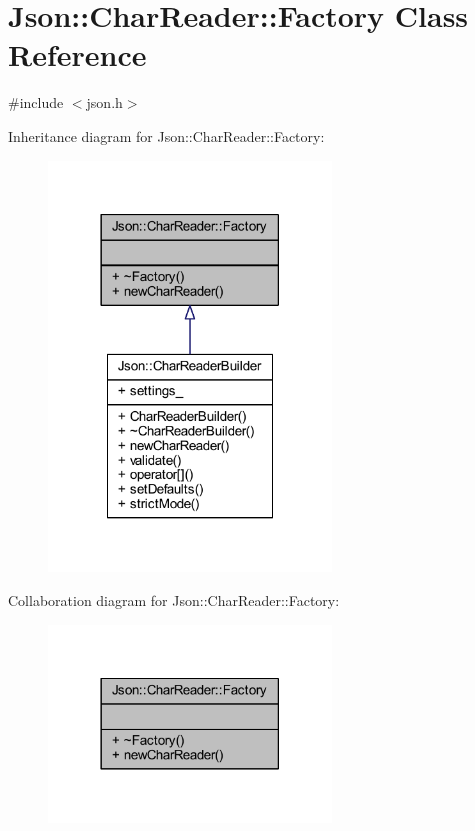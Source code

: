\hypertarget{class_json_1_1_char_reader_1_1_factory}{}\section{Json\+:\+:Char\+Reader\+:\+:Factory Class Reference}
\label{class_json_1_1_char_reader_1_1_factory}


{\ttfamily \#include $<$json.\+h$>$}



Inheritance diagram for Json\+:\+:Char\+Reader\+:\+:Factory\+:\nopagebreak
\begin{figure}[H]
\begin{center}
\leavevmode
\includegraphics[width=213pt]{class_json_1_1_char_reader_1_1_factory__inherit__graph}
\end{center}
\end{figure}


Collaboration diagram for Json\+:\+:Char\+Reader\+:\+:Factory\+:\nopagebreak
\begin{figure}[H]
\begin{center}
\leavevmode
\includegraphics[width=213pt]{class_json_1_1_char_reader_1_1_factory__coll__graph}
\end{center}
\end{figure}
